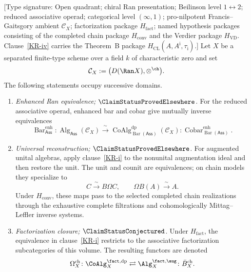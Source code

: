 \begin{theorem}
\label{thm:koszul-reflection}
\textup{[Type signature: Open quadrant; chiral Ran presentation;
Beilinson level $1\leftrightarrow2$; reduced associative operad;
categorical level $(\infty,1)$; pro-nilpotent Francis--Gaitsgory
ambient $\mathcal C_X$; factorization package
$H_{\mathrm{fact}}$; named hypothesis packages consisting of the
completed chain package $H_{\mathrm{conv}}$ and the Verdier package
$H_{\mathrm{VD}}$.  Clause~\ref{KR-iv} carries the
Theorem~B package
$H_{\mathrm{CL}}(A,A^{\mathrm i},\tau_{\mathrm i})$.]}
Let $X$ be a separated finite-type scheme over a field $k$ of
characteristic zero and set
\[
 \mathcal C_X:=\bigl(D(\Ran X),\otimes^{\ch}\bigr).
\]
The following statements occupy successive domains.
\begin{enumerate}[label=\textup{(\roman*)}]
\item \label{KR-i} \emph{Enhanced Ran equivalence;
$\ClaimStatusProvedElsewhere$.}
For the reduced associative operad, enhanced bar and cobar give
mutually inverse equivalences
\[
 \operatorname{Bar}^{\mathrm{enh}}_{\mathsf{Ass}}\colon
 \operatorname{Alg}_{\mathsf{Ass}}(\mathcal C_X)
 \xrightarrow{\ \sim\ }
 \operatorname{CoAlg}^{\mathrm{dp}}_{
      \operatorname{Bar}(\mathsf{Ass})}(\mathcal C_X)
 \mathbin{:}
 \operatorname{Cobar}^{\mathrm{enh}}_{
      \operatorname{Bar}(\mathsf{Ass})}.
\]
\item \label{KR-ii} \emph{Universal reconstruction;
$\ClaimStatusProvedElsewhere$.}
For augmented unital algebras, apply clause~\ref{KR-i} to the
nonunital augmentation ideal and then restore the unit.  The unit and
counit are equivalences; on chain models they specialize to
\[
 C\xrightarrow{\ \sim\ }B\Omega C,
 \qquad
 \Omega B(A)\xrightarrow{\ \sim\ }A.
\]
Under $H_{\mathrm{conv}}$, these maps pass to the selected completed
chain realizations through the exhaustive complete filtrations and
cohomologically Mittag--Leffler inverse systems.
\item \label{KR-iii} \emph{Factorization closure;
$\ClaimStatusConjectured$.}
Under $H_{\mathrm{fact}}$, the equivalence in clause~\ref{KR-i}
restricts to the associative factorization subcategories of this
volume.  The resulting functors are denoted
\[
 \Omegach_X\colon\CoAlg_X^{\fact,\mathrm{dp}}
 \rightleftarrows
 \Alg_X^{\fact,\aug}\colon\Bbarch_X .
\]
\end{enumerate}
\end{theorem}
